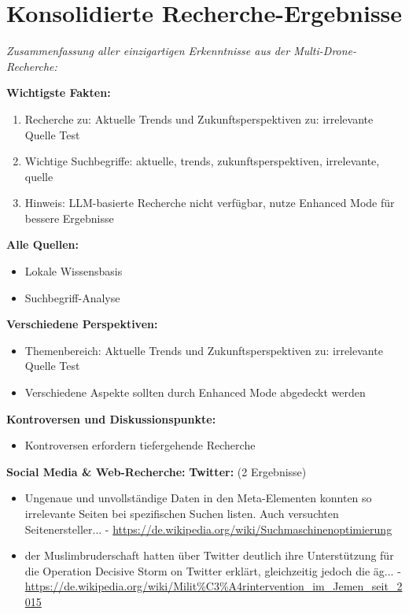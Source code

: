 \documentclass[12pt,a4paper]{article}
\begin{document}
\newpage
\section{Konsolidierte Recherche-Ergebnisse}

\textit{Zusammenfassung aller einzigartigen Erkenntnisse aus der Multi-Drone-Recherche:}

\textbf{Wichtigste Fakten:}
\begin{enumerate}
\item Recherche zu: Aktuelle Trends und Zukunftsperspektiven zu: irrelevante Quelle Test
\item Wichtige Suchbegriffe: aktuelle, trends, zukunftsperspektiven, irrelevante, quelle
\item Hinweis: LLM-basierte Recherche nicht verfügbar, nutze Enhanced Mode für bessere Ergebnisse
\end{enumerate}

\textbf{Alle Quellen:}
\begin{itemize}
\item Lokale Wissensbasis
\item Suchbegriff-Analyse
\end{itemize}

\textbf{Verschiedene Perspektiven:}
\begin{itemize}
\item Themenbereich: Aktuelle Trends und Zukunftsperspektiven zu: irrelevante Quelle Test
\item Verschiedene Aspekte sollten durch Enhanced Mode abgedeckt werden
\end{itemize}

\textbf{Kontroversen und Diskussionspunkte:}
\begin{itemize}
\item Kontroversen erfordern tiefergehende Recherche
\end{itemize}

\textbf{Social Media \& Web-Recherche:}
\textbf{Twitter:} (2 Ergebnisse)
\begin{itemize}
\item  Ungenaue und unvollständige Daten in den Meta-Elementen konnten so irrelevante Seiten bei spezifischen Suchen listen. Auch versuchten Seitenersteller... - \url{https://de.wikipedia.org/wiki/Suchmaschinenoptimierung}
\item der Muslimbruderschaft hatten über Twitter deutlich ihre Unterstützung für die Operation Decisive Storm on Twitter erklärt, gleichzeitig jedoch die äg... - \url{https://de.wikipedia.org/wiki/Milit%C3%A4rintervention_im_Jemen_seit_2015}
\end{itemize}
\end{document}
